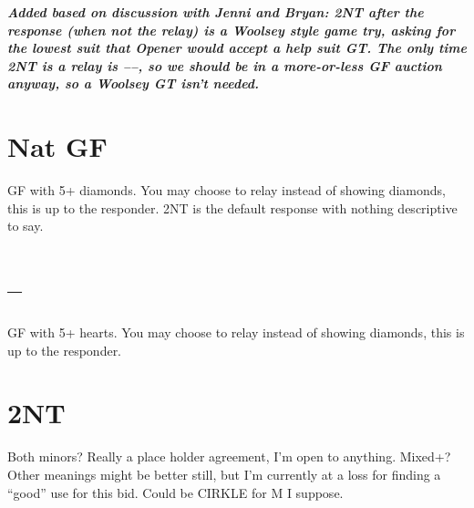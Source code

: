 \documentclass[tom-ari]{subfile}
\begin{document}
	\textbf{\textit{Added based on discussion with Jenni and Bryan:  2NT after the response (when not the relay) is a Woolsey style game try, asking for the lowest suit that Opener would accept a help suit GT.  The only time 2NT is a relay is ----, so we should be in a more-or-less GF auction anyway, so a Woolsey GT isn't needed.}}
	
	\reversemarginpar
	
	
	\section[2D Nat GF]{ Nat GF}
	
	GF with 5+ diamonds. You may choose to relay instead of showing diamonds, this is up to the responder. 2NT is the default response with nothing descriptive to say.
	
	
	\section[1S--2H]{--}
	
	GF with 5+ hearts. You may choose to relay instead of showing diamonds, this is up to the responder.
	
			
	\section{2NT}
	
	Both minors?  Really a place holder agreement, I'm open to anything. Mixed+? Other meanings might be better still, but I'm currently at a loss for finding a ``good'' use for this bid. Could be CIRKLE for M I suppose.
	
\end{document}
